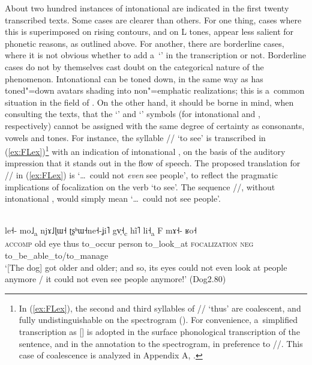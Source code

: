 About two hundred instances of intonational  are indicated in the first twenty transcribed
texts. Some cases are clearer than others. For one thing, cases where this  is
superimposed on rising contours, and on L tones, appear less salient for phonetic reasons, as outlined above. For another, there are borderline cases, where it is not obvious whether to add a~‘’ in the
transcription or not. Borderline cases do not by themselves cast doubt on the categorical nature of the phenomenon. Intonational  can be toned down, in the same way as  has toned"=down avatars shading into non"=emphatic realizations; this is a~common situation in the field of . On the other hand, it should be borne in mind, when consulting the texts, that the ‘' and ‘' symbols (for intonational  and , respectively) cannot be assigned with the same degree of certainty as consonants, vowels and tones. For instance, the syllable // ‘to see’ is transcribed in (\ref{ex:FLex})\footnote{In (\ref{ex:FLex}), the second and third syllables of // ‘thus’ are coalescent, and fully undistinguishable on the spectrogram (). For convenience, a~simplified transcription as [] is adopted in the surface phonological transcription of the sentence, and in the annotation to the spectrogram, in preference to //. This case of coalescence is analyzed in Appendix A, .} with an indication of intonational , on the basis of the auditory impression that it stands out in the flow of speech. The proposed translation for // in (\ref{ex:FLex}) is ‘{\dots}~could not \textit{even} see people’, to reflect the pragmatic implications of focalization on the verb ‘to see’. The sequence //, without intonational , would simply mean ‘{\dots}~could not see people’. 

\begin{exe}
	\ex
	\label{ex:FLex}
	\\ 
	\gll le˧-				mo˩\textsubscript{a}		njɤ˩ɭɯ˧		ʈʂʰɯ˧ne˧-ʝi˥		gv̩˧\textsubscript{c}				hĩ˥		 li˧\textsubscript{a}	F	mɤ˧-		ʁo˧\\
	\textsc{accomp}		old								eye				thus				to\_occur		person		to\_look\_at	\textsc{focalization}	\textsc{neg}		to\_be\_able\_to/to\_manage\\
	\glt ‘[The dog] got older and older; and so, its eyes could not even look at people anymore / it could not even see people anymore!’ (Dog2.80)
\end{exe}

